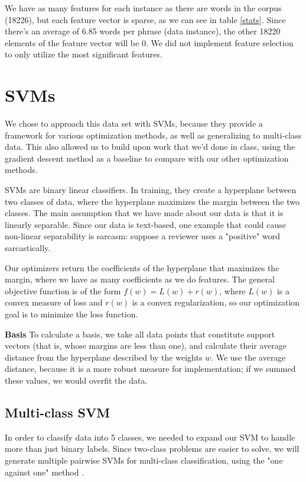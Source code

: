 \documentclass[letterpaper, 11pt]{article}
\begin{document}
We have as many features for each instance as there are words in the corpus (18226), but each feature vector is sparse, as we can see in table \ref{stats}.  Since there's an average of 6.85 words per phrase (data instance), the other 18220 elements of the feature vector will be 0.  We did not implement feature selection to only utilize the most significant features.

\section{SVMs}
We chose to approach this data set with SVMs, because they provide a framework for various optimization methods, as well as generalizing to multi-class data.  This also allowed us to build upon work that we'd done in class, using the gradient descent method as a baseline to compare with our other optimization methods.

SVMs are binary linear classifiers.  In training, they create a hyperplane between two classes of data, where the hyperplane maximizes the margin between the two classes.  The main assumption that we have made about our data is that it is linearly separable.  Since our data is text-based, one example that could cause non-linear separability is sarcasm: suppose a reviewer uses a "positive" word sarcastically.

Our optimizers return the coefficients of the hyperplane that maximizes the margin, where we have as many coefficients as we do features.  The general objective function is of the form $f(w) = L(w) + r(w) $, where $L(w)$ is a convex measure of loss and $r(w)$ is a convex regularization, so our optimization goal is to minimize the loss function.

\textbf{Basis} To calculate a basis, we take all data points that constitute support vectors (that is, whose margins are less than one), and calculate their average distance from the hyperplane described by the weights $w$.  We use the average distance, because it is a more robust measure for implementation; if we summed these values, we would overfit the data. %


\subsection{Multi-class SVM}
In order to classify data into 5 classes, we needed to expand our SVM to handle more than just binary labels.  Since two-class problems are easier to solve, we will generate multiple pairwise SVMs for multi-class classification, using the "one against one" method \cite{milgram2006one}.
\end{document}
